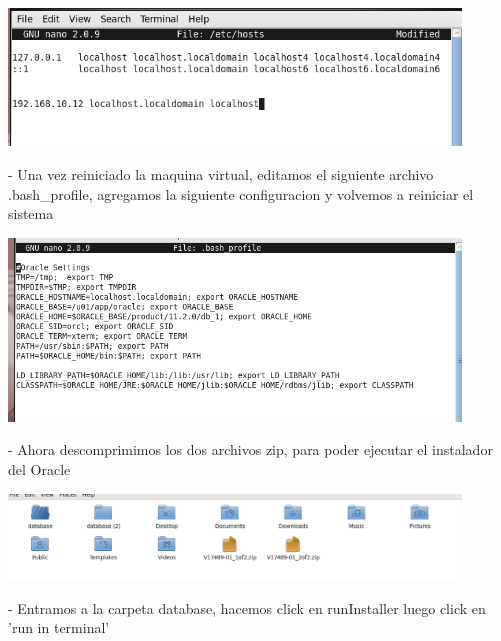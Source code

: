 \documentclass[12pt,letterpaper]{article}
\begin{document}
\begin{center}
	\includegraphics[width=12cm]{./Imagenes/23} 
\end{center}


\begin{itemize}
- Una vez reiniciado la maquina virtual, editamos el siguiente archivo .bash_profile, agregamos la siguiente configuracion y volvemos a reiniciar el sistema\\
\end{itemize}

\begin{center}
	\includegraphics[width=12cm]{./Imagenes/24} 
\end{center}



\begin{itemize}
- Ahora descomprimimos los dos archivos zip, para poder ejecutar el instalador del Oracle\\
\end{itemize}

\begin{center}
	\includegraphics[width=12cm]{./Imagenes/25} 
\end{center}



\begin{itemize}
- Entramos a la carpeta database, hacemos click en runInstaller luego click en 'run in terminal'\\
\end{itemize}
\end{document}
